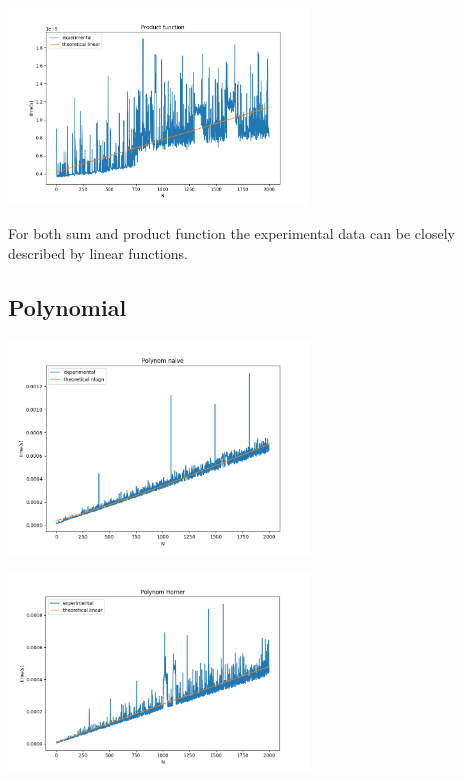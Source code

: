 \begin{center}
    \includegraphics[width=0.6\textwidth]{../results/product_f.png}
\end{center}

For both sum and product function the experimental data can be closely described by linear functions.

\subsection*{Polynomial}

\begin{center}
    \includegraphics[width=0.6\textwidth]{../results/polynom_naive.png}
\end{center}

\begin{center}
    \includegraphics[width=0.6\textwidth]{../results/polynom_horner.png}
\end{center}

